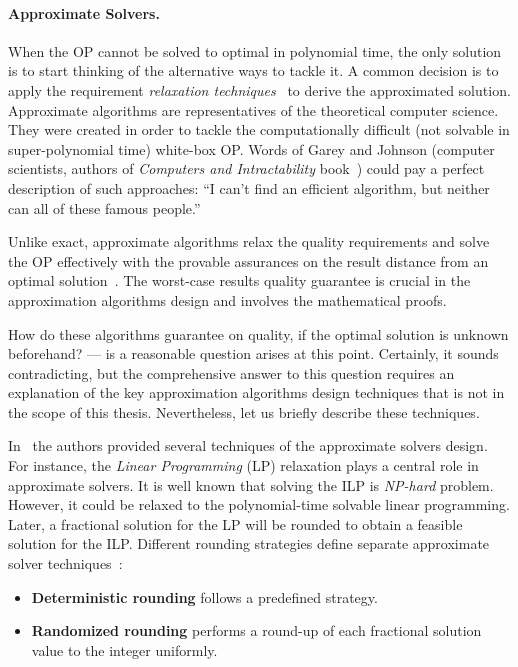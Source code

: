 \paragraph{Approximate Solvers.} When the OP cannot be solved to optimal in polynomial time, the only solution is to start thinking of the alternative ways to tackle it. A common decision is to apply the requirement \emph{relaxation techniques}~\cite{roubivcek2011relaxation} to derive the approximated solution.
Approximate algorithms are representatives of the theoretical computer science. They were created in order to tackle the computationally difficult (not solvable in super-polynomial time) white-box OP. Words of Garey and Johnson (computer scientists, authors of \textit{Computers and Intractability} book~\cite{garey1979computers}) could pay a perfect description of such approaches: ``I can't find an efficient algorithm, but neither can all of these famous people.''

Unlike exact, approximate algorithms relax the quality requirements and solve the OP effectively with the provable assurances on the result distance from an optimal solution~\cite{williamson2011design}. The worst-case results quality guarantee is crucial in the approximation algorithms design and involves the mathematical proofs.

How do these algorithms guarantee on quality, if the optimal solution is unknown beforehand? — is a reasonable question arises at this point. Certainly, it sounds contradicting, but the comprehensive answer to this question requires an explanation of the key approximation algorithms design techniques that is not in the scope of this thesis. Nevertheless, let us briefly describe these techniques.

In~\cite{williamson2011design} the authors provided several techniques of the approximate solvers design. For instance, the \emph{Linear Programming} (LP) relaxation plays a central role in approximate solvers. It is well known that solving the ILP is \textit{NP-hard} problem. However, it could be relaxed to the polynomial-time solvable linear programming. %
Later, a fractional solution for the LP will be rounded to obtain a feasible solution for the ILP. %
Different rounding strategies define separate approximate solver techniques~\cite{williamson2011design}: 
\begin{itemize}
	\item \textbf{Deterministic rounding} follows a predefined strategy.
	\item \textbf{Randomized rounding} performs a round-up of each fractional solution value to the integer uniformly.
\end{itemize}

